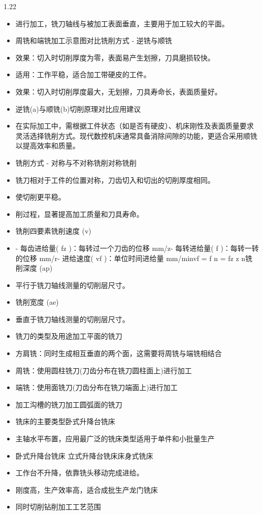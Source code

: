 \documentclass[12pt,a4paper]{article}
\begin{document}
\begin{spacing}{1.22}
\begin{itemize}[leftmargin=2.2em,label=--]
  \item 进行加工，铣刀轴线与被加工表面垂直，主要用于加工较大的平面。
  \item 周铣和端铣加工示意图对比铣削方式 - 逆铣与顺铣
  \item 效果：切入时切削厚度为零，表面易产生划擦，刀具磨损较快。
  \item 适用：工作平稳，适合加工带硬皮的工件。
  \item 效果：切入时切削厚度最大，无划擦，刀具寿命长，表面质量好。
  \item 逆铣(a)与顺铣(b)切削原理对比应用建议
  \item 在实际加工中，需根据工件状态（如是否有硬皮）、机床刚性及表面质量要求灵活选择铣削方式。现代数控机床通常具备消除间隙的功能，更适合采用顺铣以提高效率和质量。
  \item 铣削方式 - 对称与不对称铣削对称铣削
  \item 铣刀相对于工件的位置对称，刀齿切入和切出的切削厚度相同。
  \item 使切削更平稳。
  \item 削过程，显著提高加工质量和刀具寿命。
  \item 铣削四要素铣削速度 (v)
  \item - 每齿进给量( fz )：每转过一个刀齿的位移 mm/z- 每转进给量( f )：每转一转的位移 mm/r- 进给速度( vf )：单位时间进给量 mm/minvf = f n = fz z n铣削深度 (ap)
  \item 平行于铣刀轴线测量的切削层尺寸。
  \item 铣削宽度 (ae)
  \item 垂直于铣刀轴线测量的切削层尺寸。
  \item 铣刀的类型及用途加工平面的铣刀
  \item 方肩铣：同时生成相互垂直的两个面，这需要将周铣与端铣相结合
  \item 周铣：使用圆柱铣刀(刀齿分布在铣刀圆柱面上)进行加工
  \item 端铣：使用面铣刀(刀齿分布在铣刀端面上)进行加工
  \item 加工沟槽的铣刀加工圆弧面的铣刀
  \item 铣床的主要类型卧式升降台铣床
  \item 主轴水平布置，应用最广泛的铣床类型适用于单件和小批量生产
  \item 卧式升降台铣床 立式升降台铣床床身式铣床
  \item 工作台不升降，依靠铣头移动完成进给。
  \item 刚度高，生产效率高，适合成批生产龙门铣床
  \item 同时切削钻削加工工艺范围
\end{itemize}


\end{spacing}
\end{document}
